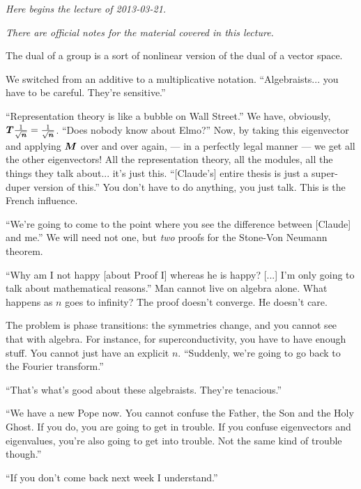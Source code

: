 \documentclass[10pt]{article}
\newenvironment{supplemental}{
\begin{mdframed}%
[hidealllines=true,                 %
  backgroundcolor=red!15!yellow!10  %
]}{\end{mdframed}}
\newcommand{\lectureStart}[1]{

\begin{flushright}
\emph{Here begins the lecture of #1.}
\end{flushright}

}
\newcommand{\lectureEnd}[1]{

}
\newcommand{\officialNotes}{

\begin{flushleft}
\emph{There are official notes for the material covered in this lecture.}
\end{flushleft}

}
\begin{document}
\begin{supplemental}
\endgroup
\end{supplemental}


\lectureStart{2013-03-21}
\officialNotes
\begingroup
\newcommand{\vsqrtninv}{\frac{1}{\sqrt{\vn}}}
The dual of a group is a sort of nonlinear version of the dual of a vector space.

We switched from an additive to a multiplicative notation. ``Algebraists... you have to be careful. They're sensitive.''

``Representation theory is like a bubble on Wall Street.'' We have, obviously, $\matT  \vsqrtninv = \vsqrtninv$. ``Does nobody know about Elmo?''  Now, by taking this eigenvector and applying $\matM$ over and over again, --- in a perfectly legal manner --- we get all the other eigenvectors! All the representation theory, all the modules, all the things they talk about... it's just this. ``[Claude's] entire thesis is just a super-duper version of this.'' You don't have to do anything, you just talk. This is the French influence.

``We're going to come to the point where you see the difference between [Claude] and me.'' We will need not one, but \emph{two} proofs for the Stone-Von Neumann theorem.

``Why am I not happy [about Proof I] whereas he is happy? [...] I'm only going to talk about mathematical reasons.'' Man cannot live on algebra alone. What happens as $n$ goes to infinity? The proof doesn't converge. He doesn't care. 

The problem is phase transitions: the symmetries change, and you cannot see that with algebra. For instance, for superconductivity, you have to have enough stuff. You cannot just have an explicit $n$. 
``Suddenly, we're going to go back to the Fourier transform.'' 

\noindent
``That's what's good about these algebraists. They're tenacious.''

``We have a new Pope now. You cannot confuse the Father, the Son and the Holy Ghost. If you do, you are going to get in trouble. If you confuse eigenvectors and eigenvalues, you're also going to get into trouble. Not the same kind of trouble though.''

``If you don't come back next week I understand.''
\endgroup
\lectureEnd{2013-03-21}
\end{document}
